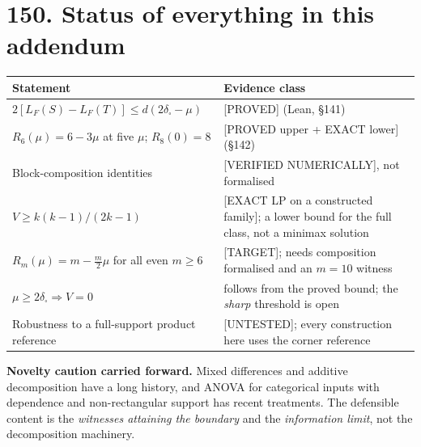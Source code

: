 \documentclass[9pt,twocolumn]{article}
\newcommand{\eclass}[1]{\textsf{[#1]}}
\renewcommand{\_}{\CIGunderscore\allowbreak}
\begin{document}
\section*{150. Status of everything in this addendum}
\begin{center}\scriptsize
\begin{tabularx}{0.98\columnwidth}{X X}
\toprule
Statement & Evidence class\\
\midrule
$2[L_F(S)-L_F(T)]\le d(2\delta_\square-\mu)$ & \eclass{PROVED} (Lean, §141)\\
$R_6(\mu)=6-3\mu$ at five $\mu$; $R_8(0)=8$ & \eclass{PROVED upper + EXACT lower} (§142)\\
Block-composition identities & \eclass{VERIFIED NUMERICALLY}, not formalised\\
$V\ge k(k-1)/(2k-1)$ & \eclass{EXACT LP on a constructed family}; a lower bound for the full class, not a minimax solution\\
$R_m(\mu)=m-\tfrac m2\mu$ for all even $m\ge6$ & \eclass{TARGET}; needs composition formalised and an $m=10$ witness\\
$\mu\ge2\delta_\square \Rightarrow V=0$ & follows from the proved bound; the \emph{sharp} threshold is open\\
Robustness to a full-support product reference & \eclass{UNTESTED}; every construction here uses the corner reference\\
\bottomrule
\end{tabularx}
\end{center}
\textbf{Novelty caution carried forward.} Mixed differences and additive decomposition have a long history, and ANOVA for categorical inputs with dependence and non-rectangular support has recent treatments. The defensible content is the \emph{witnesses attaining the boundary} and the \emph{information limit}, not the decomposition machinery.
\end{document}
